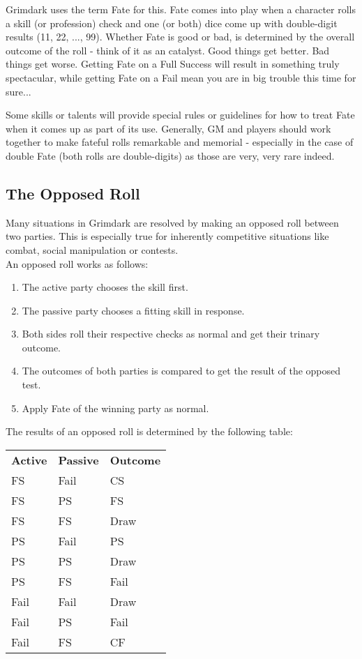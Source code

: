 Grimdark uses the term Fate for this. Fate comes into play when a character rolls a skill (or profession) check and one (or both) dice come up with double-digit results (11, 22, ..., 99).
Whether Fate is good or bad, is determined by the overall outcome of the roll - think of it as an catalyst. 
Good things get better. 
Bad things get worse.
Getting Fate on a Full Success will result in something truly spectacular, while getting Fate on a Fail mean you are in big trouble this time for sure...

Some skills or talents will provide special rules or guidelines for how to treat Fate when it comes up as part of its use.
Generally, GM and players should work together to make fateful rolls remarkable and memorial - especially in the case of double Fate (both rolls are double-digits) as those are very, very rare indeed.


\subsection{The Opposed Roll}
\label{opposed_roll}
Many situations in Grimdark are resolved by making an opposed roll between two parties.
This is especially true for inherently competitive situations like combat, social manipulation or contests.\\
An opposed roll works as follows:
\begin{enumerate}
	\item The active party chooses the skill first.
	\item The passive party chooses a fitting skill in response.
	\item Both sides roll their respective checks as normal and get their trinary outcome.
	\item The outcomes of both parties is compared to get the result of the opposed test.
	\item Apply Fate of the winning party as normal.
\end{enumerate}

The results of an opposed roll is determined by the following table:
\begin{tabular}{l | l | l}
	\textbf{Active} &  \textbf{Passive} & \textbf{Outcome} \\ 
	FS & Fail & CS\\
	FS & PS & FS \\
	FS & FS & Draw \\
	PS & Fail & PS \\
	PS & PS & Draw \\
	PS & FS & Fail \\
	Fail & Fail & Draw\\
	Fail & PS & Fail \\
	Fail & FS & CF\\
\end{tabular}

